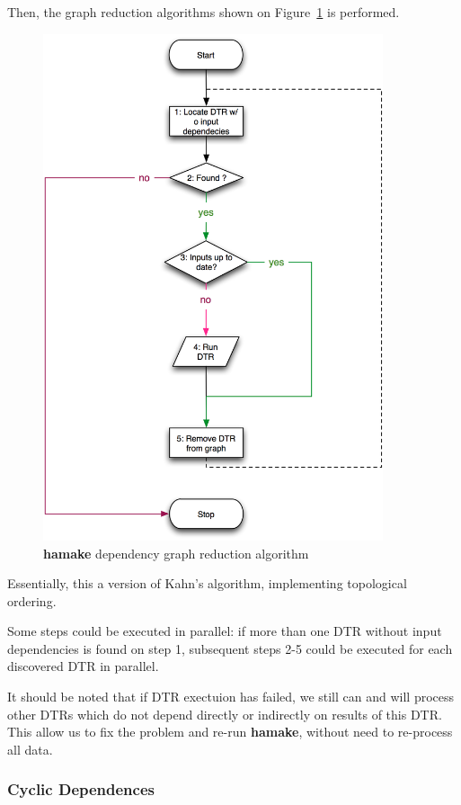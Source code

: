 \documentclass{article}
\begin{document}
Then, the graph reduction algorithms shown on Figure~\ref{fig:grred}
is performed.

\begin{figure}[htp]
\centering
\includegraphics[width=10cm]{GraphReduction.png}
\caption{\textbf{hamake} dependency graph reduction algorithm}
\label{fig:grred}
\end{figure}

Essentially, this a version of Kahn's
algorithm\cite{kahn1962topological}, implementing topological
ordering\cite{wiki:topsort}.

Some steps could be executed in parallel: if more than one DTR without
input dependencies is found on step 1, subsequent steps 2-5 could be
executed for each discovered DTR in parallel.

It should be noted that if DTR exectuion has failed, we still can and
will process other DTRs which do not depend directly or indirectly on
results of this DTR. This allow us to fix the problem and re-run
\textbf{hamake}, without need to re-process all data.

\subsubsection{Cyclic Dependences}
\end{document}
